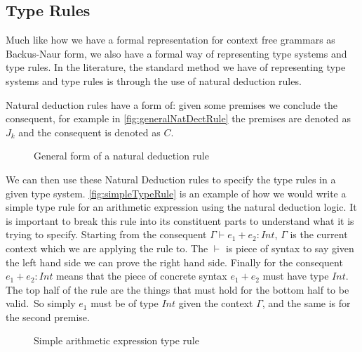 \subsection{Type Rules}
Much like how we have a formal representation for context free grammars as Backus-Naur form\cite{Backus1960,aho2003compilers,ranta2012implementing}, we also have a formal way of representing type systems and type rules.
In the literature, the standard method we have of representing type systems and type rules is through the use of natural deduction rules\cite{cardelli1996type,ranta2012implementing}.

Natural deduction rules have a form of: given some premises we conclude the consequent\cite{prawitz2006natural,ranta2012implementing}, for example in \autoref{fig:generalNatDectRule} the premises are denoted as $J_k$ and the consequent is denoted as $C$.

\begin{figure}[tbp]
    \begin{prooftree}
    \end{prooftree}
    \caption{General form of a natural deduction rule}
    \label{fig:generalNatDectRule}
\end{figure}

We can then use these Natural Deduction rules to specify the type rules in a given type system\cite{ranta2012implementing,cardelli1996type,}.
\autoref{fig:simpleTypeRule} is an example of how we would write a simple type rule for an arithmetic expression using the natural deduction logic.
It is important to break this rule into its constituent parts to understand what it is trying to specify.
Starting from the consequent $\Gamma \vdash e_1 + e_2 : Int$, $\Gamma$ is the current context which we are applying the rule to.
The $\vdash$ is piece of syntax to say given the left hand side we can prove the right hand side.
Finally for the consequent $e_1 + e_2 : Int$ means that the piece of concrete syntax $e_1 + e_2$ must have type $Int$.
The top half of the rule are the things that must hold for the bottom half to be valid.\
So simply $e_1$ must be of type $Int$ given the context $\Gamma$, and the same is for the second premise\cite{cardelli1996type,ranta2012implementing}.

\begin{figure}[tbp]
    \begin{prooftree}
    \end{prooftree}
    \caption{Simple arithmetic expression type rule}
    \label{fig:simpleTypeRule}
\end{figure}